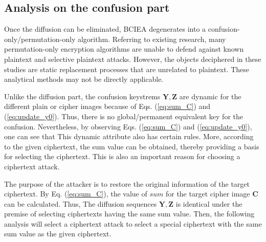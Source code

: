\documentclass[final,3p,times,twocolumn]{elsarticle}
\begin{document}
\subsection{Analysis on the confusion part}
\label{ssec:break_confusion}

Once the diffusion can be eliminated, BCIEA degenerates into a confusion-only/permutation-only algorithm. Referring to existing research, many permutation-only encryption algorithms are unable to defend against known plaintext and selective plaintext attacks.
However, the objects deciphered in these studies are static replacement processes that are unrelated to plaintext. These analytical methods may not be directly applicable.

Unlike the diffusion part, the confusion keystrems $\bm{Y},\bm{Z}$ are dynamic for the different plain or cipher images because of Eqs. (\ref{eq:sum_C}) and (\ref{eq:update_y0}). Thus, there is no global/permanent equivalent key for the confusion.
Nevertheless, by observing Eqs. (\ref{eq:sum_C}) and (\ref{eq:update_y0}), one can see that This dynamic attribute also has certain rules. 
More, according to the given ciphertext, the sum value can be obtained, thereby providing a basis for selecting the ciphertext. This is also an important reason for choosing a ciphertext attack.

The purpose of the attacker is to restore the original information of the target ciphertext. By Eq. (\ref{eq:sum_C}), the value of $sum$ for the target cipher image $\bm{C}$ can be calculated. Thus, The diffusion sequences $\bm{Y},\bm{Z}$ is identical under the premise of selecting ciphertexts having the same sum value. Then, the following analysis will select a ciphertext attack to select a special ciphertext with the same sum value as the given ciphertext.
\end{document}

